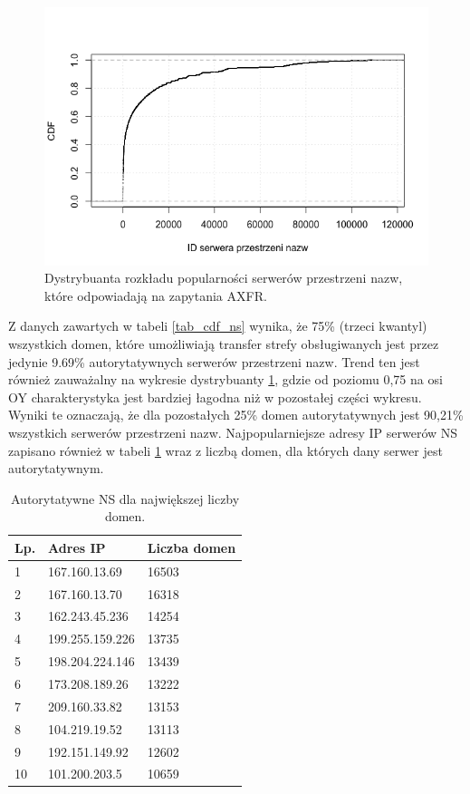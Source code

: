 \begin{figure}[h]
\centering
\includegraphics[width=1.0\textwidth]{image/cdf_ns_responded}
\caption{Dystrybuanta rozkładu popularności serwerów przestrzeni nazw, które odpowiadają na zapytania AXFR.}
\label{fig:cdf_ns}
\end{figure}

Z danych zawartych w tabeli \ref{tab_cdf_ns} wynika, że 75\% (trzeci kwantyl) wszystkich domen, które umożliwiają transfer strefy
obsługiwanych jest przez jedynie 9.69\% autorytatywnych serwerów przestrzeni nazw. Trend ten jest również zauważalny na wykresie
dystrybuanty \ref{fig:cdf_ns}, gdzie od poziomu 0,75 na osi OY charakterystyka jest bardziej łagodna niż w pozostałej części wykresu.
Wyniki te oznaczają, że dla pozostałych 25\% domen autorytatywnych jest 90,21\% wszystkich serwerów przestrzeni nazw. Najpopularniejsze
adresy IP serwerów NS zapisano również w tabeli \ref{tab:most_cnt_ns} wraz z liczbą domen, dla których dany serwer jest autorytatywnym.

\begin{table}[h]
	\centering
	\begin{tabular}{|p{}|p{}|p{}|}
	\hline
	\textbf{Lp.} &
	\textbf{Adres IP} &
	\textbf{Liczba domen} \\
	\hline\hline
	1 & 167.160.13.69 & 16503 \\
	2 & 167.160.13.70 & 16318 \\
	3 & 162.243.45.236 & 14254 \\
	4 & 199.255.159.226 & 13735 \\
	5 & 198.204.224.146 & 13439 \\
	6 & 173.208.189.26 & 13222 \\
	7 & 209.160.33.82 & 13153 \\
	8 & 104.219.19.52 & 13113 \\
	9 & 192.151.149.92 & 12602 \\
	10 & 101.200.203.5 & 10659 \\
	\hline
	\end{tabular}
	\caption{Autorytatywne NS dla największej liczby domen.}
	\label{tab:most_cnt_ns}
\end{table}

